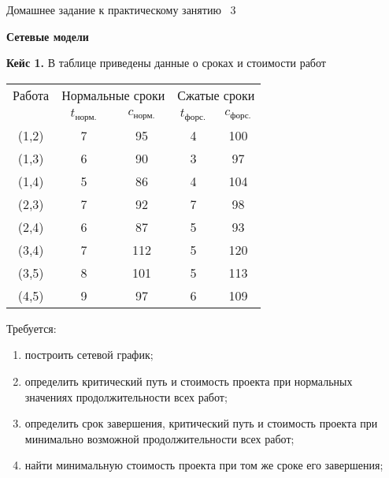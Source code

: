 \documentclass[a4paper,12pt]{extarticle}
\begin{document}
{\centering \small Домашнее задание к практическому занятию \textnumero~3 \par
\bfseries \large Сетевые модели \par}


\textbf{Кейс 1.} 
В таблице приведены данные о сроках и стоимости работ
\par{\centering
\begin{tabular}{ccccc}
\hline
Работа & \multicolumn{2}{c}{Нормальные сроки} & \multicolumn{2}{c}{Сжатые сроки}\\
 & $t_\text{норм.}$	& $c_\text{норм.}$ & $t_\text{форс.}$ & $c_\text{форс.}$ \\
\hline
(1,2) & 7 &  95 & 4 & 100 \\
(1,3) & 6 &  90 & 3 &  97 \\
(1,4) & 5 &  86 & 4 & 104 \\
(2,3) & 7 &  92 & 7 &  98 \\
(2,4) & 6 &  87 & 5 &  93 \\
(3,4) & 7 & 112 & 5 & 120 \\
(3,5) & 8 & 101 & 5 & 113 \\
(4,5) & 9 &  97 & 6 & 109 \\
\hline
\end{tabular}\par}

Требуется:
\begin{enumerate}
\item построить сетевой график;
\item определить критический путь и стоимость проекта при нормальных значениях продолжительности всех работ;
\item определить срок завершения, критический путь и стоимость проекта при минимально возможной продолжительности всех работ;
\item найти минимальную стоимость проекта при том же сроке его завершения;
\end{enumerate}
\end{document}
